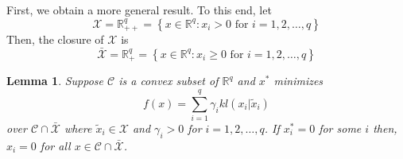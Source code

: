 \documentclass[twocolumn]{article}
\newtheorem{lemma}{Lemma}
\begin{document}
First, we obtain a more general result. To this end, let
\[
\mathcal{X} = \mathbb{R}^q_{++} =\left\{ x \in \mathbb{R}^q: x_i >0 \text{ for } i =1,2, \dots, q \right\}
\]
Then, the closure of ${\mathcal X}$ is
\[
\bar{\mathcal X} = \mathbb{R}^q_{+} =\left\{ x \in \mathbb{R}^q: x_i \ge0 \text{ for } i =1,2, \dots, q \right\}
\]
\label{sec:propmin}
\begin{lemma}
\label{lem:lem1}
Suppose  ${\mathcal C}$ is a convex subset of $\mathbb{R}^q$ and 
$x^*$ minimizes 
\begin{equation}
\label{eq:genCost1}
f(x)= \sum_{i=1}^q\gamma_i kl(x_i|\tilde{x}_i)
\end{equation}
over ${\mathcal C}\cap\bar{\mathcal X}$
where $\tilde{x}_i \in {\mathcal X}$ and $\gamma_i >0$ for $i=1,2,\dots, q$.
If  $x^*_{i} =0 $ for some $i$ then, $x_i = 0$ for all $x \in {\mathcal C} \cap \bar{\mathcal X}$.
\end{lemma}
\end{document}
